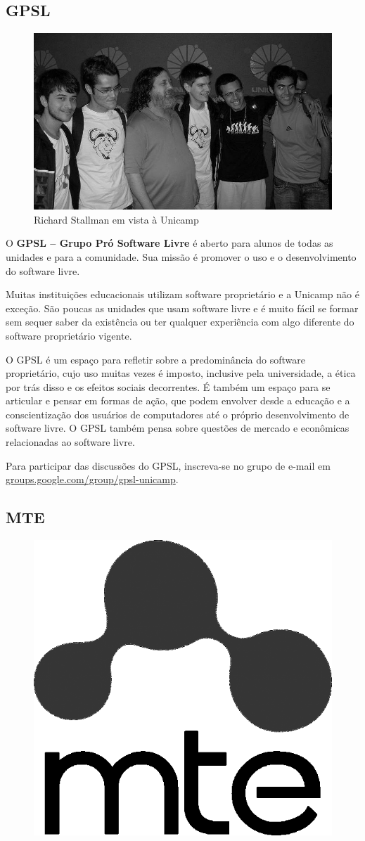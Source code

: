 \subsection{GPSL}

\begin{figure}[h!]
    \centering
    \includegraphics[width=.45\textwidth]{img/alem_da_graduacao/gpsl_foto.jpg}
    \caption{Richard Stallman em vista à Unicamp}
\end{figure}

O \textbf{GPSL -- Grupo Pró Software Livre} é aberto para alunos de todas as
unidades e para a comunidade. Sua missão é promover o uso e o desenvolvimento do
software livre.

Muitas instituições educacionais utilizam software proprietário e a Unicamp não
é exceção. São poucas as unidades que usam software livre e é muito fácil se
formar sem sequer saber da existência ou ter qualquer experiência com algo
diferente do software proprietário vigente.

O GPSL é um espaço para refletir sobre a predominância do software proprietário,
cujo uso muitas vezes é imposto, inclusive pela universidade, a ética por trás
disso e os efeitos sociais decorrentes. É também um espaço para se articular e
pensar em formas de ação, que podem envolver desde a educação e a
conscientização dos usuários de computadores até o próprio desenvolvimento de
software livre. O GPSL também pensa sobre questões de mercado e econômicas
relacionadas ao software livre.

Para participar das discussões do GPSL, inscreva-se no grupo de e-mail em
\url{groups.google.com/group/gpsl-unicamp}.

\subsection{MTE}

\begin{figure}[h!]
    \centering
    \includegraphics[width=.35\textwidth]{img/alem_da_graduacao/mte_logo.png}
\end{figure}

